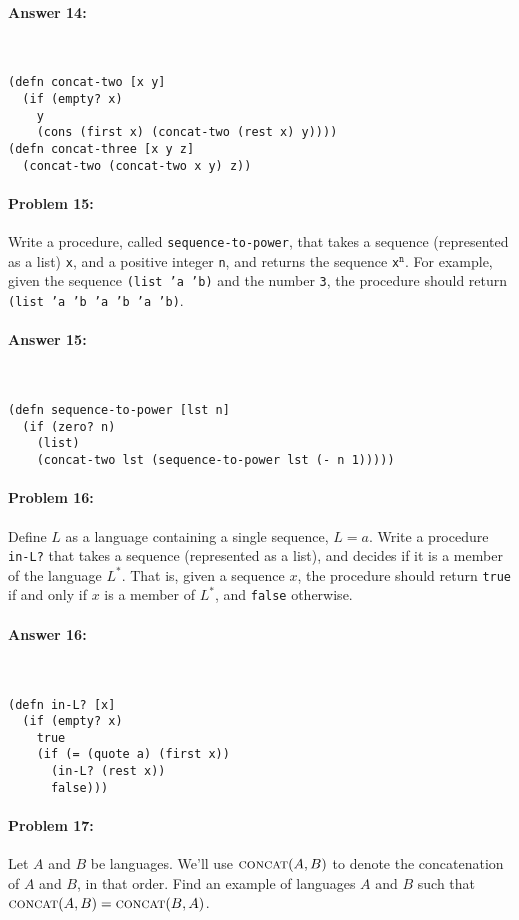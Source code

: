 \documentclass[12pt, letterpaper]{article}
\begin{document}
\paragraph{Answer 14:} ~\begin{lstlisting}
(defn concat-two [x y]
  (if (empty? x)
    y
    (cons (first x) (concat-two (rest x) y))))
(defn concat-three [x y z]
  (concat-two (concat-two x y) z))
\end{lstlisting}

\hrulefill
\paragraph{Problem 15:}
Write a procedure, called \texttt{sequence-to-power}, that takes a
sequence (represented as a list) \texttt{x}, and a positive integer
\texttt{n}, and returns the sequence \texttt{x}$^\texttt{n}$. For
example, given the sequence \texttt{(list 'a 'b)} and the number
\texttt{3}, the procedure should return \texttt{(list 'a 'b 'a 'b 'a
  'b)}.

\paragraph{Answer 15:}~\begin{lstlisting}
(defn sequence-to-power [lst n] 
  (if (zero? n)
    (list)
    (concat-two lst (sequence-to-power lst (- n 1)))))
\end{lstlisting}

\hrulefill
\paragraph{Problem 16:}
Define $L$ as a language containing a single sequence,
$L={a}$. Write a procedure \texttt{in-L?} that takes a sequence
(represented as a list), and decides if it is a member of the language
$L^*$. That is, given a sequence $x$, the procedure should return
\texttt{true} if and only if $x$ is a member of $L^*$, and
\texttt{false} otherwise.

\paragraph{Answer 16:}~\begin{lstlisting}
(defn in-L? [x]
  (if (empty? x)
    true
    (if (= (quote a) (first x))
      (in-L? (rest x))
      false)))
\end{lstlisting}

\hrulefill
\paragraph{Problem 17:}
Let $A$ and $B$ be languages. We'll use $\textsc{concat}(A,B)$ to
denote the concatenation of $A$ and $B$, in that order. Find an
example of languages $A$ and $B$ such that
$\textsc{concat}(A,B)=\textsc{concat}(B,A)$.
\end{document}
